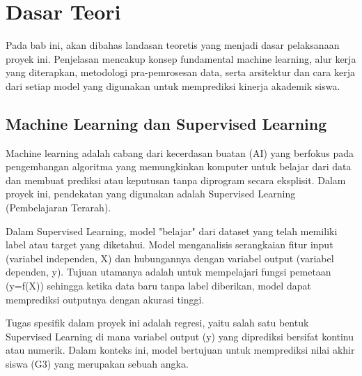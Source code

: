 \chapter*{Dasar Teori}

Pada bab ini, akan dibahas landasan teoretis yang menjadi dasar pelaksanaan proyek ini. Penjelasan mencakup konsep fundamental machine learning, alur kerja yang diterapkan, metodologi pra-pemrosesan data, serta arsitektur dan cara kerja dari setiap model yang digunakan untuk memprediksi kinerja akademik siswa.

\section{Machine Learning dan Supervised Learning}
Machine learning adalah cabang dari kecerdasan buatan (AI) yang berfokus pada pengembangan algoritma yang memungkinkan komputer untuk belajar dari data dan membuat prediksi atau keputusan tanpa diprogram secara eksplisit. Dalam proyek ini, pendekatan yang digunakan adalah Supervised Learning (Pembelajaran Terarah).

Dalam Supervised Learning, model "belajar" dari dataset yang telah memiliki label atau target yang diketahui. Model menganalisis serangkaian fitur input (variabel independen, X) dan hubungannya dengan variabel output (variabel dependen, y). Tujuan utamanya adalah untuk mempelajari fungsi pemetaan (y=f(X)) sehingga ketika data baru tanpa label diberikan, model dapat memprediksi outputnya dengan akurasi tinggi.

Tugas spesifik dalam proyek ini adalah regresi, yaitu salah satu bentuk Supervised Learning di mana variabel output (y) yang diprediksi bersifat kontinu atau numerik. Dalam konteks ini, model bertujuan untuk memprediksi nilai akhir siswa (G3) yang merupakan sebuah angka.

